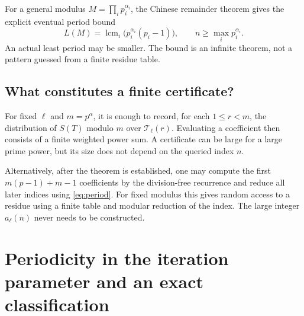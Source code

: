 \documentclass[11pt,letterpaper]{article}
\theoremstyle{definition}
\theoremstyle{remark}
\newcommand{\T}{\mathcal T}
\newcommand{\lcm}{\operatorname{lcm}}
\begin{document}
For a general modulus $M=\prod_i p_i^{\alpha_i}$, the Chinese remainder
theorem gives the explicit eventual period bound
\begin{equation}\label{eq:compositeperiod}
 L(M)=\lcm_i\bigl(p_i^{\alpha_i}(p_i-1)\bigr),
 \qquad n\ge\max_i p_i^{\alpha_i}.
\end{equation}
An actual least period may be smaller. The bound is an infinite theorem,
not a pattern guessed from a finite residue table.

\subsection{What constitutes a finite certificate?}
For fixed $\ell$ and $m=p^\alpha$, it is enough to record, for each
$1\le r<m$, the distribution of $S(T)$ modulo $m$ over
$\T_\ell(r)$. Evaluating a coefficient then consists of a finite weighted
power sum. A certificate can be large for a large prime power, but its
size does not depend on the queried index $n$.

Alternatively, after the theorem is established, one may compute the
first $m(p-1)+m-1$ coefficients by the division-free recurrence and reduce
all later indices using \eqref{eq:period}. For fixed modulus this gives
random access to a residue using a finite table and modular reduction of
the index. The large integer $a_\ell(n)$ never needs to be constructed.

\section{Periodicity in the iteration parameter and an exact classification}
\label{sec:parameter}
\end{document}

